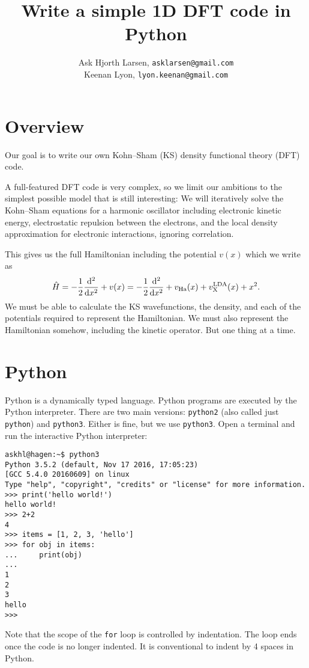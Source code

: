 \documentclass{article}
\title{Write a simple 1D DFT code in Python}
\author{
  Ask Hjorth Larsen, \texttt{asklarsen@gmail.com}\\
  Keenan Lyon, \texttt{lyon.keenan@gmail.com}
}
\begin{document}
\maketitle

\section*{Overview}

Our goal is to write our own Kohn--Sham (KS) density functional theory
(DFT) code.

A full-featured DFT code is very complex, so we limit our ambitions
to the simplest possible model that is still interesting:
We will iteratively solve the Kohn--Sham
equations for a harmonic oscillator including electronic kinetic
energy, electrostatic repulsion between the electrons, and the
local density approximation for electronic interactions, ignoring correlation.

This gives us the full Hamiltonian including the potential $v(x)$
which we write as
\begin{align}
\hat H = -\frac12 \frac{\mathrm d ^2}{\mathrm d x^2} + v(x) = -\frac12 \frac{\mathrm d ^2}{\mathrm d x^2} + v_{\mathrm{Ha}}(x) + v_{\mathrm X}^{\mathrm{LDA}}(x) + x^2.
\end{align}
We must be able to calculate the KS wavefunctions, the
density, and each of the potentials required to represent the
Hamiltonian.  We must also represent the Hamiltonian somehow,
including the kinetic operator.  But one thing at a time.

\section*{Python}
Python is a dynamically typed language.  Python programs are executed
by the Python interpreter.
There are two main versions:
\texttt{python2} (also called just \texttt{python}) and \texttt{python3}.
Either is fine, but we use \texttt{python3}.
Open a terminal and
run the interactive Python interpreter:

\begin{verbatim}
askhl@hagen:~$ python3
Python 3.5.2 (default, Nov 17 2016, 17:05:23)
[GCC 5.4.0 20160609] on linux
Type "help", "copyright", "credits" or "license" for more information.
>>> print('hello world!')
hello world!
>>> 2+2
4
>>> items = [1, 2, 3, 'hello']
>>> for obj in items:
...     print(obj)
...
1
2
3
hello
>>>
\end{verbatim}
Note that the scope of the \lstinline{for} loop is controlled by indentation.
The loop ends once the code is no longer indented.
It is conventional to indent by 4 spaces in Python.
\end{document}
